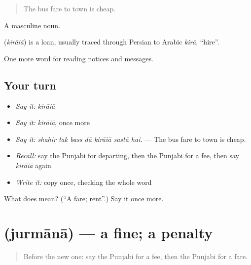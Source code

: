 \begin{quote}
The bus fare to town is cheap.
\end{quote}

A masculine noun.

\begin{cousinweb}
\textbf{} (\emph{kirāiā}) is a loan, usually traced through Persian to Arabic \emph{kirā}, \textquotedblleft{}hire\textquotedblright{}.
\end{cousinweb}

\begin{grammarlens}[title={What you've built}]
One more word for reading notices and messages.
\end{grammarlens}

\subsection*{Your turn}
\begin{itemize}
\raggedright
  \item \emph{Say it:} \emph{kirāiā}
  \item \emph{Say it:} \emph{kirāiā}, once more
  \item \emph{Say it:} \emph{shahir tak bass dā kirāiā sastā hai.} — The bus fare to town is cheap.
  \item \emph{Recall:} say the Punjabi for departing, then the Punjabi for a fee, then say \emph{kirāiā} again
  \item \emph{Write it:} copy \textbf{} once, checking the whole word
\end{itemize}

\begin{tcolorbox}[breakable,colback=teal!4,colframe=teal!35!black,title={Before you move on}]
What does  mean? (\textquotedblleft{}A fare; rent\textquotedblright{}.) Say it once more.
\end{tcolorbox}
\section[\texorpdfstring{\pa{ਜੁਰਮਾਨਾ} (jurmānā)}{ਜੁਰਮਾਨਾ (jurmānā)}]{ (jurmānā) — a fine; a penalty}

\label{lesson:PA-C262-jurmana}



\begin{quote}
Before the new one: say the Punjabi for a fee, then the Punjabi for a fare.
\end{quote}

